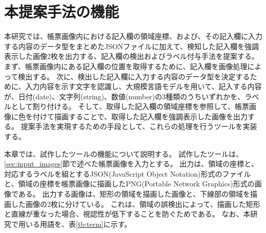 \chapter{本提案手法の機能}\label{cha:Function}
本研究では、帳票画像内における記入欄の領域座標、および、その記入欄に入力する内容のデータ型をまとめたJSONファイルに加えて、検知した記入欄を強調表示した画像2枚を出力する、記入欄の検出およびラベル付与手法を提案する。
まず、帳票画像内にある記入欄の位置を取得するために、記入欄を画像処理によって検出する。
次に、検出した記入欄に入力する内容のデータ型を決定するために、入力内容を示す文字を認識し、大規模言語モデルを用いて、記入する内容が、日付(date)、文字列(string)、数値(number)の3種類のうちいずれかを、ラベルとして割り付ける。
そして、取得した記入欄の領域座標を参照して、帳票画像に色を付けて描画することで、取得した記入欄を強調表示した画像を出力する。
提案手法を実現するための手段として、これらの処理を行うツールを実装する。

本章では、試作したツールの機能について説明する。
試作したツールは、\ref{sec:input_images}節で述べた帳票画像を入力とする。
出力は、領域の座標と、対応するラベルを組とするJSON(JavaScript Object Notation)形式のファイルと、領域の座標を帳票画像に描画したPNG(Portable Network Graphics)形式の画像である。
出力する画像は、矩形の領域を描画した画像と、下線部の領域を描画した画像の2枚に分けている。
これは、領域の誤検出によって、描画した矩形と直線が重なった場合、視認性が低下することを防ぐためである。
なお、本研究で用いる用語を、表\ref{tb:term}に示す。

